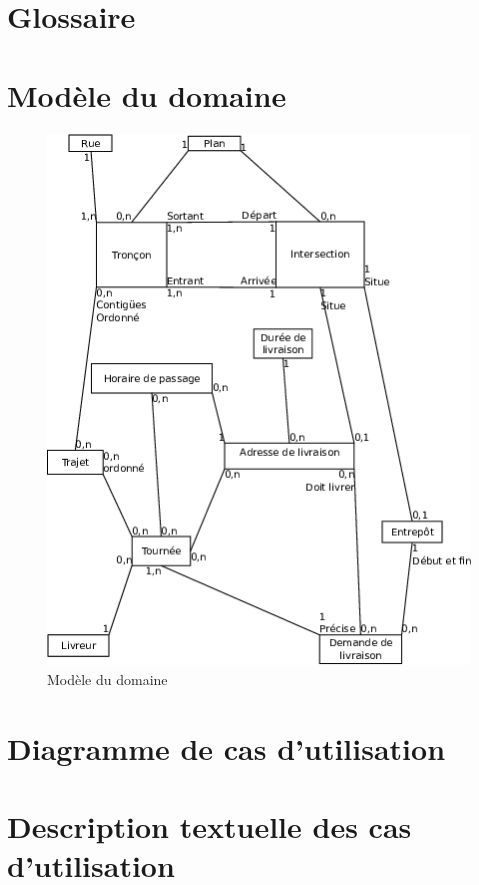 \documentclass[a4paper,10pt]{article}
\begin{document}
\begin{titlepage}
  
\end{titlepage}
\tableofcontents
\pagebreak

\section{Glossaire}


\section{Modèle du domaine}

\begin{figure}[h!]
  \begin{center}
    \includegraphics[width=0.7\linewidth]{images/Modele.png}
    \caption{Modèle du domaine}
    \label{fig:modele}
  \end{center}
\end{figure}

\section{Diagramme de cas d'utilisation}

\section{Description textuelle des cas d’utilisation}
\end{document}

